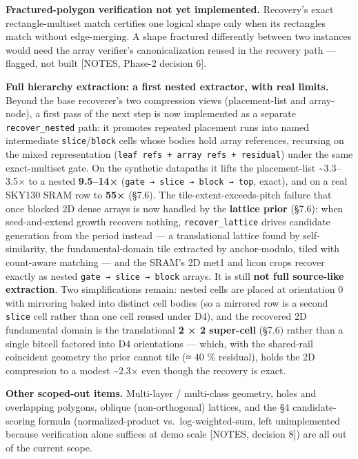\documentclass[
  11pt,
]{article}
\begin{document}
\textbf{Fractured-polygon verification not yet implemented.} Recovery's
exact rectangle-multiset match certifies one logical shape only when its
rectangles match without edge-merging. A shape fractured differently
between two instances would need the array verifier's canonicalization
reused in the recovery path --- flagged, not built {[}NOTES, Phase-2
decision 6{]}.

\textbf{Full hierarchy extraction: a first nested extractor, with real
limits.} Beyond the base recoverer's two compression views
(placement-list and array-node), a first pass of the next step is now
implemented as a separate \texttt{recover\_nested} path: it promotes
repeated placement runs into named intermediate
\texttt{slice}/\texttt{block} cells whose bodies hold array references,
recursing on the mixed representation
(\texttt{leaf\ refs\ +\ array\ refs\ +\ residual}) under the same
exact-multiset gate. On the synthetic datapaths it lifts the
placement-list \textasciitilde3.3--3.5× to a nested \textbf{9.5--14×}
(\texttt{gate\ →\ slice\ →\ block\ →\ top}, exact), and on a real SKY130
SRAM row to \textbf{55×} (§7.6). The tile-extent-exceeds-pitch failure
that once blocked 2D dense arrays is now handled by the \textbf{lattice
prior} (§7.6): when seed-and-extend growth recovers nothing,
\texttt{recover\_lattice} drives candidate generation from the period
instead --- a translational lattice found by self-similarity, the
fundamental-domain tile extracted by anchor-modulo, tiled with
count-aware matching --- and the SRAM's 2D met1 and licon crops recover
exactly as nested \texttt{gate\ →\ slice\ →\ block} arrays. It is still
\textbf{not full source-like extraction}. Two simplifications remain:
nested cells are placed at orientation 0 with mirroring baked into
distinct cell bodies (so a mirrored row is a second \texttt{slice} cell
rather than one cell reused under D4), and the recovered 2D fundamental
domain is the translational \textbf{2 × 2 super-cell} (§7.6) rather than
a single bitcell factored into D4 orientations --- which, with the
shared-rail coincident geometry the prior cannot tile (≈ 40 \%
residual), holds the 2D compression to a modest \textasciitilde2.3× even
though the recovery is exact.

\textbf{Other scoped-out items.} Multi-layer / multi-class geometry,
holes and overlapping polygons, oblique (non-orthogonal) lattices, and
the §4 candidate-scoring formula (normalized-product
vs.~log-weighted-sum, left unimplemented because verification alone
suffices at demo scale {[}NOTES, decision 8{]}) are all out of the
current scope.
\end{document}
